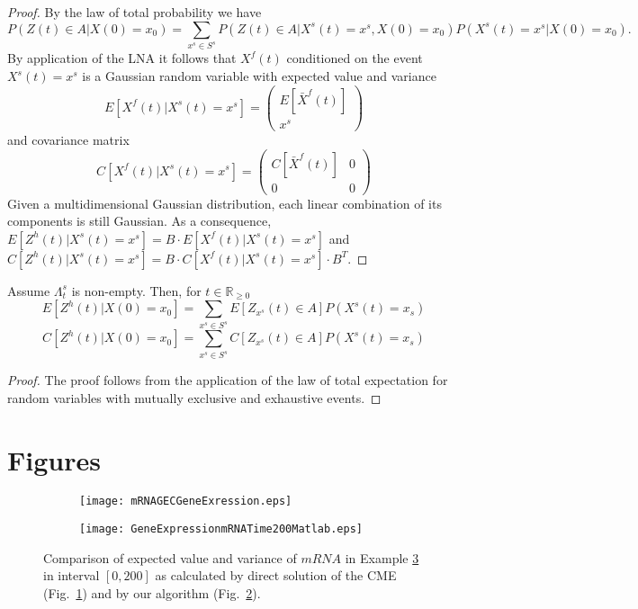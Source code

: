 \documentclass{llncs}
\begin{document}
\begin{proof}
By the law of total probability we have 
\[
P(Z(t)\in A|X(0)=x_0)=\sum_{x^s \in S^s}P(Z(t)\in A|X^s(t)=x^s,X(0)=x_0)P(X^s(t)=x^s|X(0)=x_0).
\]
By application of the LNA it follows that $X^f(t)$ conditioned on the event $X^s(t)=x^s$ is a Gaussian random variable with expected value and variance 
\[
E[X^f(t)|X^s(t)=x^s]=\begin{pmatrix}
E[\bar{X}^f(t)]\\
x^s
\end{pmatrix}
\]
and covariance matrix 
\[ C[X^f(t)|X^s(t)=x^s]=\begin{pmatrix}
C[\bar{X}^f(t)]&0\\
0&0
\end{pmatrix}
\]
Given a multidimensional Gaussian distribution, each linear combination of its components is still Gaussian. As a consequence, $E[Z^h(t)|X^s(t)=x^s]=B\cdot E[X^f(t)|X^s(t)=x^s]$ and $C[Z^h(t)|X^s(t)=x^s]=B\cdot C[X^f(t)|X^s(t)=x^s]\cdot B^T$.

\end{proof}


\begin{theorem}
Assume $\Lambda^s_t$ is non-empty. Then, for $t\in \mathbb{R}_{\geq 0}$
\begin{equation*}\label{Eq-a1}
E[Z^h(t)|X(0)=x_0]=\sum_{x^s \in S^s} E[Z_{x^s}(t)\in A]P(X^s(t)=x_s)
\end{equation*}
\begin{equation*}\label{Eq-a2}
C[Z^h(t)|X(0)=x_0]=\sum_{x^s \in S^s} C[Z_{x^s}(t)\in A]P(X^s(t)=x_s)
\end{equation*}
\end{theorem}
\begin{proof}
The proof follows from the application of the law of total expectation for random variables with mutually exclusive and exhaustive events.  
\end{proof}

\vspace{-1em}
\section{Figures}
\vspace{-1em}
\begin{figure}
	\centering
	\begin{subfigure}{.5\textwidth}
     \centering
     \texttt{[image: mRNAGECGeneExression.eps]}
     \caption{}
     \label{fig:sub1}
   \end{subfigure}%
\begin{subfigure}{.5\textwidth}
  \centering
  \texttt{[image: GeneExpressionmRNATime200Matlab.eps]}
  \caption{}
  \label{fig:sub2}
\end{subfigure}
\caption{Comparison of expected value and variance of $mRNA$ in Example \ref{Gene} in interval $[0,200]$ as calculated by direct solution of the CME (Fig.\ \ref{fig:sub1}) and by our algorithm (Fig.\ \ref{fig:sub2}).}
\label{Gene}
\end{figure}%
\end{document}
